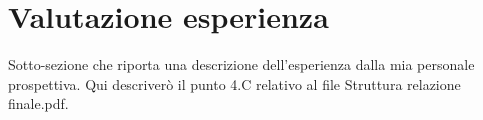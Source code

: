 \section{Valutazione esperienza}

Sotto-sezione che riporta una descrizione dell'esperienza dalla mia personale prospettiva.
Qui descriverò il punto 4.C relativo al file Struttura relazione finale.pdf.